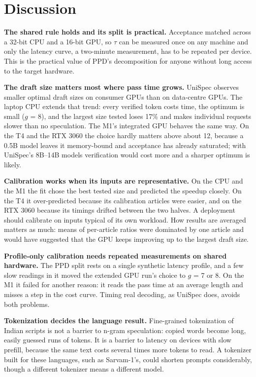 \documentclass[11pt,a4paper]{article}
\begin{document}
\section{Discussion}
\textbf{The shared rule holds and its split is practical.} Acceptance matched across a 32-bit CPU and a 16-bit GPU, so $\tau$ can be measured once on any machine and only the latency curve, a two-minute measurement, has to be repeated per device. This is the practical value of PPD's decomposition for anyone without long access to the target hardware.

\textbf{The draft size matters most where pass time grows.} UniSpec observes smaller optimal draft sizes on consumer GPUs than on data-centre GPUs. The laptop CPU extends that trend: every verified token costs time, the optimum is small ($g$ = 8), and the largest size tested loses 17\% and makes individual requests slower than no speculation. The M1's integrated GPU behaves the same way. On the T4 and the RTX 3060 the choice hardly matters above about 12, because a 0.5B model leaves it memory-bound and acceptance has already saturated; with UniSpec's 8B--14B models verification would cost more and a sharper optimum is likely.

\textbf{Calibration works when its inputs are representative.} On the CPU and the M1 the fit chose the best tested size and predicted the speedup closely. On the T4 it over-predicted because its calibration articles were easier, and on the RTX 3060 because its timings drifted between the two halves. A deployment should calibrate on inputs typical of its own workload. How results are averaged matters as much: means of per-article ratios were dominated by one article and would have suggested that the GPU keeps improving up to the largest draft size.

\textbf{Profile-only calibration needs repeated measurements on shared hardware.} The PPD split rests on a single synthetic latency profile, and a few slow readings in it moved the extended GPU run's choice to $g$ = 7 or 8. On the M1 it failed for another reason: it reads the pass time at an average length and misses a step in the cost curve. Timing real decoding, as UniSpec does, avoids both problems.

\textbf{Tokenization decides the language result.} Fine-grained tokenization of Indian scripts is not a barrier to n-gram speculation: copied words become long, easily guessed runs of tokens. It is a barrier to latency on devices with slow prefill, because the same text costs several times more tokens to read. A tokenizer built for these languages, such as Sarvam-1's, could shorten prompts considerably, though a different tokenizer means a different model.
\end{document}
